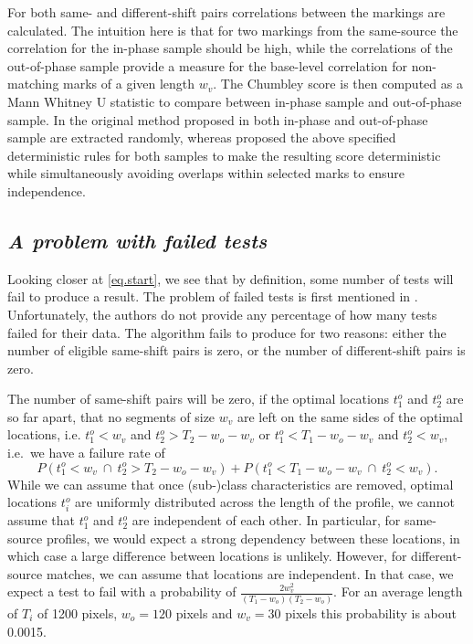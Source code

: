 \documentclass[12pt]{article}
\begin{document}
For both same- and different-shift pairs correlations between the
markings are calculated. The intuition here is that for two markings
from the same-source the correlation for the in-phase sample should be
high, while the correlations of the out-of-phase sample provide a
measure for the base-level correlation for non-matching marks of a given
length \(w_v\). The Chumbley score is then computed as a Mann Whitney U
statistic to compare between in-phase sample and out-of-phase sample. In
the original method proposed in \citet{chumbley} both in-phase and
out-of-phase sample are extracted randomly, whereas \citet{hadler}
proposed the above specified deterministic rules for both samples to
make the resulting score deterministic while simultaneously avoiding
overlaps within selected marks to ensure independence.

\hypertarget{a-problem-with-failed-tests}{%
\subsection*{\texorpdfstring{\emph{A problem with failed
tests}}{A problem with failed tests}}\label{a-problem-with-failed-tests}}

Looking closer at \autoref{eq.start}, we see that by definition, some
number of tests will fail to produce a result. The problem of failed
tests is first mentioned in \citet{afte-chumbley}. Unfortunately, the
authors do not provide any percentage of how many tests failed for their
data. The algorithm fails to produce for two reasons: either the number
of eligible same-shift pairs is zero, or the number of different-shift
pairs is zero.

The number of same-shift pairs will be zero, if the optimal locations
\(t_1^{o}\) and \(t_2^{o}\) are so far apart, that no segments of size
\(w_v\) are left on the same sides of the optimal locations, i.e.
\(t_1^{o} < w_v\) and \(t_2^{o} > T_2-w_o-w_v\) or
\(t_1^{o} < T_1- w_o - w_v\) and \(t_2^{o} < w_v\), i.e.~we have a
failure rate of \[
P\left( t_1^{o} < w_v \ \cap \ t_2^{o} > T_2-w_o-w_v\right) + P\left( t_1^{o} < T_1- w_o - w_v \ \cap \ t_2^{o} < w_v\right).
\] While we can assume that once (sub-)class characteristics are
removed, optimal locations \(t_i^{o}\) are uniformly distributed across
the length of the profile, we cannot assume that \(t_1^o\) and \(t_2^o\)
are independent of each other. In particular, for same-source profiles,
we would expect a strong dependency between these locations, in which
case a large difference between locations is unlikely. However, for
different-source matches, we can assume that locations are independent.
In that case, we expect a test to fail with a probability of
\(\frac{2 w_v^2}{(T_1-w_o)(T_2-w_o)}\). For an average length of \(T_i\)
of 1200 pixels, \(w_o = 120\) pixels and \(w_v = 30\) pixels this
probability is about 0.0015.
\end{document}
